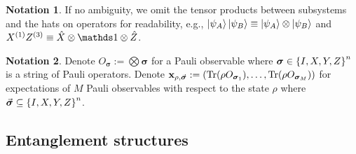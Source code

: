 \documentclass[
reprint,
aps,
pra,
floatfix,
]{revtex4-2}
\theoremstyle{plain}
\theoremstyle{definition}
\newtheorem{notation}{Notation}
\newcommand{\pob}{O}
\newcommand{\dm}{\rho}
\newcommand{\px}{X}
\newcommand{\pz}{Z}
\newcommand{\bmsigma}{\bm{\sigma}}
\begin{document}

\begin{notation}
	If no ambiguity,
	we omit the tensor products between subsystems and the hats on operators for readability,
	e.g.,
	$\ket{\psi_A}\ket{\psi_B}\equiv \ket{\psi_A}\otimes \ket{\psi_B}$ 
	and $\px^{(1)}\pz^{(3)} \equiv \hat{X} \otimes \identity \otimes \hat{Z}$.
\end{notation}
\begin{notation}
	Denote $\pob_{\bmsigma}:=\bigotimes \bmsigma$ for a Pauli observable where $\bmsigma\in \qty{I,X,Y,Z}^n$ is a string of Pauli operators.
	Denote $\vbx_{\dm,\vec{\bmsigma}}:=(\Tr(\dm\pob_{\bmsigma_1}),\dots,\Tr(\dm\pob_{\bmsigma_M}))$ for expectations of $M$ Pauli observables with respect to the state $\dm$ where $\vec{\bmsigma}\subseteq \qty{I,X,Y,Z}^n$.
\end{notation}

\subsection{Entanglement structures}
\end{document}
